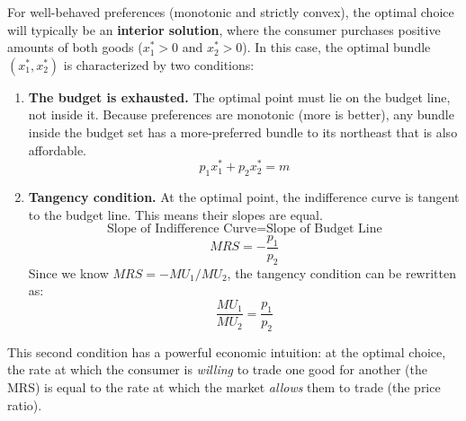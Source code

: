 For well-behaved preferences (monotonic and strictly convex), the optimal choice will typically be an \textbf{interior solution}, where the consumer purchases positive amounts of both goods ($x_1^* > 0$ and $x_2^* > 0$). In this case, the optimal bundle $(x_1^*, x_2^*)$ is characterized by two conditions:

\begin{enumerate}
    \item \textbf{The budget is exhausted.} The optimal point must lie on the budget line, not inside it. Because preferences are monotonic (more is better), any bundle inside the budget set has a more-preferred bundle to its northeast that is also affordable.
    \[ p_1x_1^* + p_2x_2^* = m \]
    \item \textbf{Tangency condition.} At the optimal point, the indifference curve is tangent to the budget line. This means their slopes are equal.
    \[ \text{Slope of Indifference Curve} = \text{Slope of Budget Line} \]
    \[ MRS = -\frac{p_1}{p_2} \]
    Since we know $MRS = -MU_1/MU_2$, the tangency condition can be rewritten as:
    \[ \frac{MU_1}{MU_2} = \frac{p_1}{p_2} \]
\end{enumerate}

This second condition has a powerful economic intuition: at the optimal choice, the rate at which the consumer is \textit{willing} to trade one good for another (the MRS) is equal to the rate at which the market \textit{allows} them to trade (the price ratio).

